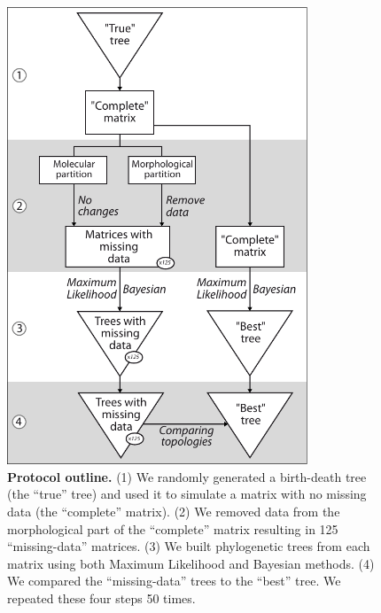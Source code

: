 \begin{figure}[!htbp]
\centering
    \includegraphics[width=0.8\textwidth]{TEM/Figures/Fig1.pdf}
\caption[Protocol outline]{\textbf{Protocol outline.}
(1) We randomly generated a birth-death tree (the ``true'' tree) and used it to simulate a matrix with no missing data (the ``complete'' matrix).
(2) We removed data from the morphological part of the ``complete'' matrix resulting in 125 ``missing-data'' matrices.
(3) We built phylogenetic trees from each matrix using both Maximum Likelihood and Bayesian methods.
(4) We compared the ``missing-data'' trees to the ``best'' tree.
We repeated these four steps 50 times.}
\label{Fig_Outline}
\end{figure}


